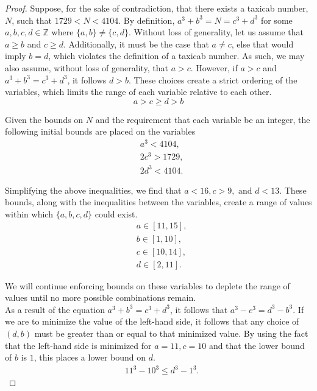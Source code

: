 \documentclass[12pt]{amsart}
\theoremstyle{definition}
\theoremstyle{remark}
\begin{document}
\begin{proof}
    Suppose, for the sake of contradiction, that there exists a taxicab number, $N$, such that $1729 < N < 4104$. By definition, $a^3+b^3=N=c^3+d^3$ for some $a,b,c,d \in \mathbb{Z}$ where $\{a,b\} \neq \{c,d\}$. Without loss of generality, let us assume that $a\geq b$ and $c\geq d$. Additionally, it must be the case that $a\neq c$, else that would imply $b=d$, which violates the definition of a taxicab number. As such, we may also assume, without loss of generality, that $a>c$. However, if $a>c$ and $a^3+b^3=c^3+d^3$, it follows $d>b$. These choices create a strict ordering of the variables, which limits the range of each variable relative to each other.
    \[ a > c \geq d >b\]

    Given the bounds on $N$ and the requirement that each variable be an integer, the following initial bounds are placed on the variables
    \begin{align*}
      &a^3 < 4104,\\
      &2c^3>1729, \\
      &2d^3 < 4104.   
    \end{align*}

    Simplifying the above inequalities, we find that $a<16,c>9, \text{ and } d<13$. These bounds, along with the inequalities between the variables, create a range of values within which $\{a,b,c,d\}$ could exist.
    \begin{align*}
        & a \in [11,15], \\
        & b \in [1,10],  \\
        &c \in  [10,14],  \\
        &d \in  [2,11].
    \end{align*}

    We will continue enforcing bounds on these variables to deplete the range of values until no more possible combinations remain. \\

    As a result of the equation $a^3+b^3=c^3+d^3$, it follows that $a^3-c^3=d^3-b^3$. If we are to minimize the value of the left-hand side, it follows that any choice of $(d,b)$ must be greater than or equal to that minimized value. By using the fact that the left-hand side is minimized for $a=11,c=10$ and that the lower bound of $b$ is $1$, this places a lower bound on $d$. 
 \begin{align*}
     &11^3-10^3 \leq d^3-1^3.
 \end{align*}


\end{proof}
\end{document}
